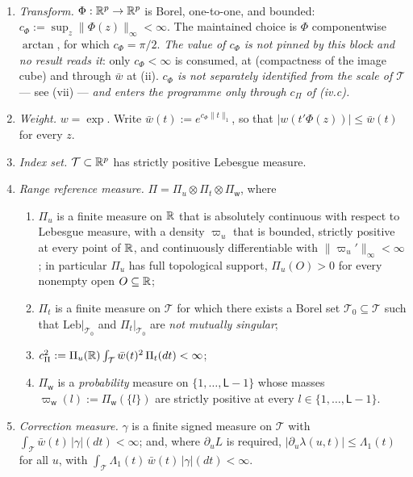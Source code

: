 \begin{assumption}\label{ass:bierens}~
\begin{enumerate}
\item[(i)] \emph{Transform.} $\Phi:\mathbb{R}^{p}\to\mathbb{R}^{p}$ is Borel, one-to-one, and bounded:
$c_\Phi:=\sup_{z}\|\Phi(z)\|_\infty<\infty$. The maintained choice is $\Phi$ componentwise $\arctan$,
for which $c_\Phi=\pi/2$. \emph{The value of $c_\Phi$ is not pinned by this block and no result reads
it}: only $c_\Phi<\infty$ is consumed, at  \textup{(compactness of the
image cube)} and through $\bar w$ at \textup{(ii)}. \emph{$c_\Phi$ is not separately identified from
the scale of $\mathcal T$} --- see \textup{(vii)} --- \emph{and enters the
programme only through $c_\Pi$ of \textup{(iv.c)}.}
\item[(ii)] \emph{Weight.} $w=\exp$. Write $\bar w(t):=e^{c_\Phi\|t\|_1}$, so that
$|w(t'\Phi(z))|\le\bar w(t)$ for every $z$.
\item[(iii)] \emph{Index set.} $\mathcal T\subset\mathbb{R}^{p}$ has strictly positive Lebesgue measure.
\item[(iv)] \emph{Range reference measure.} $\Pi=\Pi_u\otimes\Pi_t\otimes\Pi_{\mathsf w}$, where
\begin{enumerate}
\item[(iv.a)] $\Pi_u$ is a finite measure on $\mathbb{R}$ that is absolutely continuous with respect to
Lebesgue measure, with a density $\varpi_u$ that is bounded, strictly positive at every point of $\mathbb{R}$,
and continuously differentiable with $\|\varpi_u'\|_\infty<\infty$; in particular $\Pi_u$ has full
topological support, $\Pi_u(O)>0$ for every nonempty open $O\subseteq\mathbb{R}$;
\item[(iv.b)] $\Pi_t$ is a finite measure on $\mathcal T$ for which there exists a Borel set
$\mathcal T_0\subseteq\mathcal T$ such that $\mathrm{Leb}|_{\mathcal T_0}$ and $\Pi_t|_{\mathcal T_0}$
are \emph{not mutually singular};
\item[(iv.c)] $c_\Pi^{2}:=\Pi_u(\mathbb{R})\int_{\mathcal T}\bar w(t)^{2}\,\Pi_t(dt)<\infty$;
\item[(iv.d)] $\Pi_{\mathsf w}$ is a \emph{probability} measure on $\{1,\dots,\mathsf L-1\}$ whose masses
$\varpi_{\mathsf w}(l):=\Pi_{\mathsf w}(\{l\})$ are strictly positive at every
$l\in\{1,\dots,\mathsf L-1\}$.
\end{enumerate}
\item[(v)] \emph{Correction measure.} $\gamma$ is a finite signed measure on $\mathcal T$ with
$\int_{\mathcal T}\bar w(t)\,|\gamma|(dt)<\infty$; and, where $\partial_u L$ is required,
$|\partial_u\lambda(u,t)|\le\Lambda_1(t)$ for all $u$, with
$\int_{\mathcal T}\Lambda_1(t)\,\bar w(t)\,|\gamma|(dt)<\infty$.
\end{enumerate}
\end{assumption}

